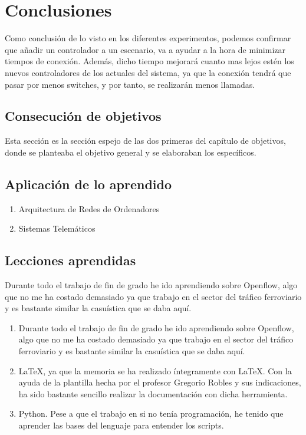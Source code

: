 \documentclass[a4paper, 12pt]{book}
\begin{document}
	\cleardoublepage
	\chapter{Conclusiones}
	\label{chap:conclusiones}
	
	Como conclusión de lo visto en los diferentes experimentos, podemos confirmar que añadir un controlador a un escenario, va a ayudar a la hora de minimizar tiempos de conexión. Además, dicho tiempo mejorará cuanto mas lejos estén los nuevos controladores de los actuales del sistema, ya que la conexión tendrá que pasar por menos switches, y por tanto, se realizarán menos llamadas.
	
	\section{Consecución de objetivos}
	\label{sec:consecucion-objetivos}
	
	Esta sección es la sección espejo de las dos primeras del capítulo de objetivos, donde se planteaba el objetivo general y se elaboraban los específicos.
	
	\section{Aplicación de lo aprendido}
	\label{sec:aplicacion}
	
	\begin{enumerate}
		\item Arquitectura de Redes de Ordenadores
		\item Sistemas Telemáticos
	\end{enumerate}
	
	
	\section{Lecciones aprendidas}
	\label{sec:lecciones_aprendidas}
	
	Durante todo el trabajo de fin de grado he ido aprendiendo sobre Openflow, algo que no me ha costado demasiado ya que trabajo en el sector del tráfico ferroviario y es bastante similar la casuística que se daba aquí.
	
	\begin{enumerate}
		\item Durante todo el trabajo de fin de grado he ido aprendiendo sobre Openflow, algo que no me ha costado demasiado ya que trabajo en el sector del tráfico ferroviario y es bastante similar la casuística que se daba aquí.
		\item LaTeX, ya que la memoria se ha realizado íntegramente con LaTeX. Con la ayuda de la plantilla hecha por el profesor Gregorio Robles y sus indicaciones, ha sido bastante sencillo realizar la documentación con dicha herramienta.
		\item Python. Pese a que el trabajo en si no tenía programación, he tenido que aprender las bases del lenguaje para entender los scripts.
		
	\end{enumerate}
	
\end{document}
